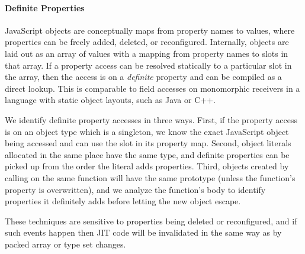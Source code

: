 \paragraph{Definite Properties}

JavaScript objects are conceptually maps
from property names to values, where properties can be freely added,
deleted, or reconfigured.
Internally, objects are laid out as an array of values with a mapping from
property names to slots in that array.
If a property access can be resolved statically to a particular slot in the
array, then the access is on a {\it definite} property and can be compiled
as a direct lookup. This is comparable to
field accesses on monomorphic receivers in a language with static object layouts,
such as Java or C++.

We identify definite property accesses in three ways.
First, if the property access is on an object type which is a singleton,
we know the exact JavaScript object being accessed and can use the slot
in its property map.
Second, object literals allocated in the same place have the same type,
and definite properties can be picked up from the order the literal
adds properties.
Third, objects created by calling  on the same function will have the
same prototype (unless the function's  property is overwritten),
and we analyze the function's body to identify properties it definitely
adds before letting the new object escape.

These techniques are sensitive to properties being deleted or
reconfigured, and if such events happen then JIT code will be invalidated
in the same way as by packed array or type set changes.

